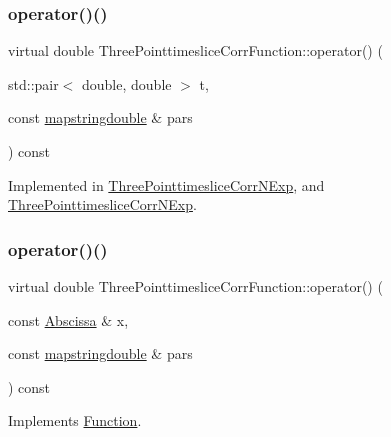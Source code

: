 \subsubsection{\texorpdfstring{operator()()}{operator()()}\hspace{0.1cm}{\footnotesize\ttfamily [2/4]}}
{\footnotesize\ttfamily virtual double Three\+Pointtimeslice\+Corr\+Function\+::operator() (\begin{DoxyParamCaption}\item[{std\+::pair$<$ double, double $>$}]{t,  }\item[{const \mbox{\hyperlink{lib_2fitting__lib_2includes_8h_a647b481c557c7966517f753340a81d13}{mapstringdouble}} \&}]{pars }\end{DoxyParamCaption}) const\hspace{0.3cm}{\ttfamily [pure virtual]}}



Implemented in \mbox{\hyperlink{classThreePointtimesliceCorrNExp_a32c3a96362aae58e8eb5a5eb8f5aafc9}{Three\+Pointtimeslice\+Corr\+N\+Exp}}, and \mbox{\hyperlink{classThreePointtimesliceCorrNExp_a32c3a96362aae58e8eb5a5eb8f5aafc9}{Three\+Pointtimeslice\+Corr\+N\+Exp}}.

\mbox{\label{classThreePointtimesliceCorrFunction_af4198f5c0d9085c5dcc8d79447d54348}} 
\subsubsection{\texorpdfstring{operator()()}{operator()()}\hspace{0.1cm}{\footnotesize\ttfamily [3/4]}}
{\footnotesize\ttfamily virtual double Three\+Pointtimeslice\+Corr\+Function\+::operator() (\begin{DoxyParamCaption}\item[{const \mbox{\hyperlink{classAbscissa}{Abscissa}} \&}]{x,  }\item[{const \mbox{\hyperlink{lib_2fitting__lib_2includes_8h_a647b481c557c7966517f753340a81d13}{mapstringdouble}} \&}]{pars }\end{DoxyParamCaption}) const\hspace{0.3cm}{\ttfamily [pure virtual]}}



Implements \mbox{\hyperlink{classFunction_a8cd7f815d5f883cc523341c53ba811d0}{Function}}.



